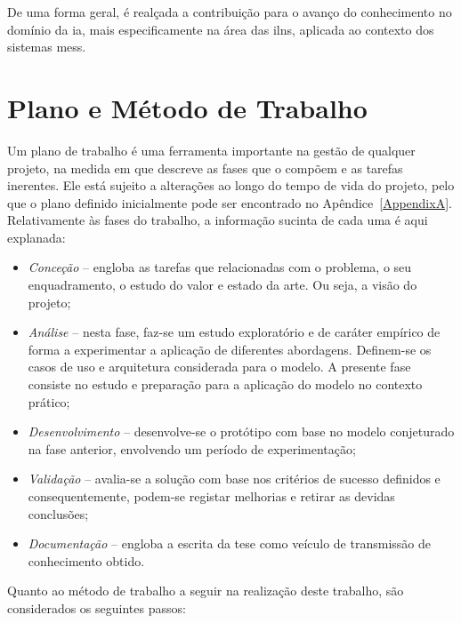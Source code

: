 De uma forma geral, é realçada a contribuição para o avanço do conhecimento no domínio da \gls{ia}, mais especificamente na área das \glspl{iln}, aplicada ao contexto dos sistemas \glspl{mes}.

\section{Plano e Método de Trabalho}
\label{sec:chap01_workmethodology}
Um plano de trabalho é uma ferramenta importante na gestão de qualquer projeto, na medida em que descreve as fases que o compõem e as tarefas inerentes. Ele está sujeito a alterações ao longo do tempo de vida do projeto, pelo que o plano definido inicialmente pode ser encontrado no Apêndice~\ref{AppendixA}. Relativamente às fases do trabalho, a informação sucinta de cada uma é aqui explanada:

\begin{itemize}
    \item
    {
        \textit{Conceção} -- engloba as tarefas que relacionadas com o problema, o seu enquadramento, o estudo do valor e estado da arte. Ou seja, a visão do projeto;
    }
    \item
    {
        \textit{Análise} -- nesta fase, faz-se um estudo exploratório e de caráter empírico de forma a experimentar a aplicação de diferentes abordagens. Definem-se os casos de uso e arquitetura considerada para o modelo. A presente fase consiste no estudo e preparação para a aplicação do modelo no contexto prático; 
    }
    \item
    {
        \textit{Desenvolvimento} -- desenvolve-se o protótipo com base no modelo conjeturado na fase anterior, envolvendo um período de experimentação;
    }
    \item
    {
        \textit{Validação} -- avalia-se a solução com base nos critérios de sucesso definidos e consequentemente, podem-se registar melhorias e retirar as devidas conclusões;
    }
    \item
    {
        \textit{Documentação} -- engloba a escrita da tese como veículo de transmissão de conhecimento obtido.
    }
\end{itemize}

Quanto ao método de trabalho a seguir na realização deste trabalho, são considerados os seguintes passos:

